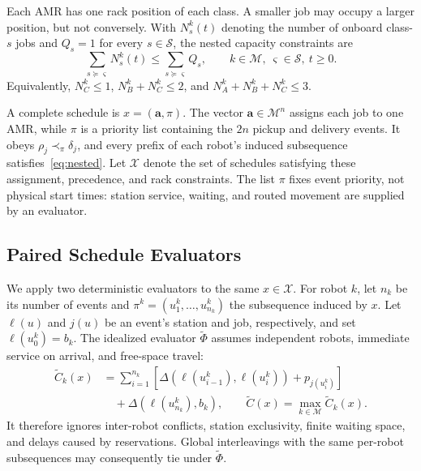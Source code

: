Each AMR has one rack position of each class. A smaller job may occupy a
larger position, but not conversely. With $N_s^k(t)$ denoting the number of
onboard class-$s$ jobs and $Q_s=1$ for every $s\in\mathcal S$, the nested
capacity constraints are
\begin{equation}
 \sum_{s\succeq\varsigma}N_s^k(t)
 \le \sum_{s\succeq\varsigma}Q_s,\qquad
 k\in\mathcal M,\ \varsigma\in\mathcal S,\ t\ge0.
 \label{eq:nested}
\end{equation}
Equivalently, $N_C^k\le1$, $N_B^k+N_C^k\le2$, and
$N_A^k+N_B^k+N_C^k\le3$.

A complete schedule is $x=(\bm a,\pi)$. The vector
$\bm a\in\mathcal M^n$ assigns each job to one AMR, while $\pi$ is a priority
list containing the $2n$ pickup and delivery events. It obeys
$\rho_j\prec_\pi\delta_j$, and every prefix of each robot's induced
subsequence satisfies~\eqref{eq:nested}. Let $\mathcal X$ denote the set of
schedules satisfying these assignment, precedence, and rack constraints.
The list $\pi$ fixes event priority, not physical start times: station service,
waiting, and routed movement are supplied by an evaluator.

\subsection{Paired Schedule Evaluators}
\label{sec:evaluators}

We apply two deterministic evaluators to the same $x\in\mathcal X$. For
robot $k$, let $n_k$ be its number of events and
$\pi^k=(u_1^k,\ldots,u_{n_k}^k)$ the subsequence induced by $x$. Let
$\ell(u)$ and $j(u)$ be an event's station and job, respectively, and set
$\ell(u_0^k)=b_k$. The idealized evaluator $\widetilde\Phi$ assumes
independent robots, immediate service on arrival, and free-space travel:
\begin{equation}
 \begin{aligned}
 \widetilde C_k(x)
 &=\sum_{i=1}^{n_k}\!\left[
   \Delta\!\left(\ell(u_{i-1}^k),\ell(u_i^k)\right)+p_{j(u_i^k)}\right]\\
 &\quad+\Delta\!\left(\ell(u_{n_k}^k),b_k\right),
 \qquad
 \widetilde C(x)=\max_{k\in\mathcal M}\widetilde C_k(x).
 \end{aligned}
 \label{eq:ideal}
\end{equation}
It therefore ignores inter-robot conflicts, station exclusivity, finite
waiting space, and delays caused by reservations. Global interleavings with
the same per-robot subsequences may consequently tie under
$\widetilde\Phi$.

